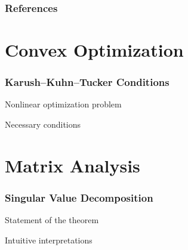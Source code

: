 \documentclass[
]{beamer}
\begin{document}
\begin{frame}%
\frametitle{References}
\footnotesize


\end{frame}

\appendix

\section*{Convex Optimization}

\begin{frame}[t]
\frametitle{Karush–Kuhn–Tucker Conditions}
Nonlinear optimization problem\par\pause
Necessary conditions
\end{frame}

\section*{Matrix Analysis}

\begin{frame}
\frametitle{Singular Value Decomposition}
Statement of the theorem\par\pause
\vspace{\baselineskip}
Intuitive interpretations
\end{frame}
\end{document}
